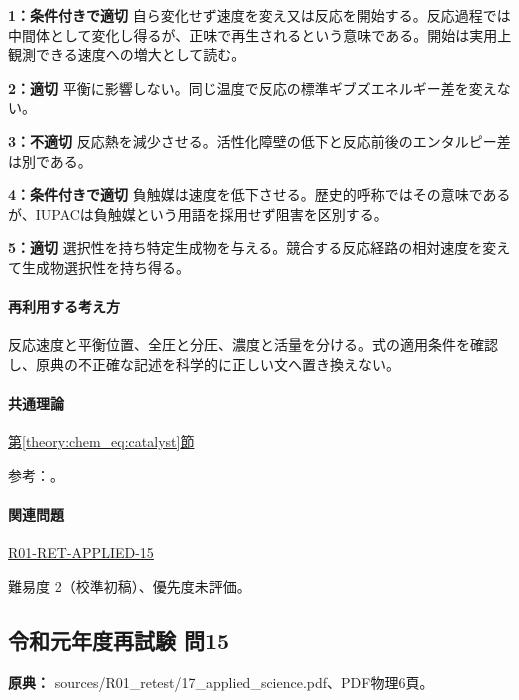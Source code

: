 \noindent\textbf{1：条件付きで適切} 自ら変化せず速度を変え又は反応を開始する。反応過程では中間体として変化し得るが、正味で再生されるという意味である。開始は実用上観測できる速度への増大として読む。\par

\noindent\textbf{2：適切} 平衡に影響しない。同じ温度で反応の標準ギブズエネルギー差を変えない。\par

\noindent\textbf{3：不適切} 反応熱を減少させる。活性化障壁の低下と反応前後のエンタルピー差は別である。\par

\noindent\textbf{4：条件付きで適切} 負触媒は速度を低下させる。歴史的呼称ではその意味であるが、IUPACは負触媒という用語を採用せず阻害を区別する。\par

\noindent\textbf{5：適切} 選択性を持ち特定生成物を与える。競合する反応経路の相対速度を変えて生成物選択性を持ち得る。\par

\paragraph{再利用する考え方} 反応速度と平衡位置、全圧と分圧、濃度と活量を分ける。式の適用条件を確認し、原典の不正確な記述を科学的に正しい文へ置き換えない。

\paragraph{共通理論} \hyperref[theory:chem_eq:catalyst]{第\ref*{theory:chem_eq:catalyst}節}

\par 参考：\cite{iupac_greenbook2012,iupac_catalyst}。

\paragraph{関連問題} \hyperref[q:r01-ret-applied-15]{R01-RET-APPLIED-15}

\par 難易度 2（校準初稿）、優先度未評価。

\subsection{令和元年度再試験 問15}
\label{q:r01-ret-applied-15}

\noindent\textbf{原典：} sources/R01\_retest/17\_applied\_science.pdf、PDF物理6頁。

